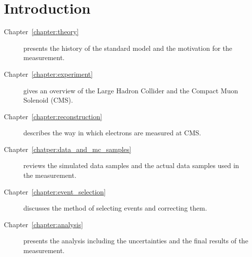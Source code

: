\chapter{Introduction}
\label{chapter:intro}

\begin{description}

    \item[Chapter~\ref{chapter:theory}] presents the history of the standard
        model and the motivation for the measurement.

    \item[Chapter~\ref{chapter:experiment}] gives an overview of the Large
        Hadron Collider and the Compact Muon Solenoid (CMS).

    \item[Chapter~\ref{chapter:reconstruction}] describes the way in which
        electrons are measured at CMS.

    \item[Chapter~\ref{chatper:data_and_mc_samples}] reviews the simulated data
        samples and the actual data samples used in the measurement.

    \item[Chapter~\ref{chapter:event_selection}] discusses the method of
        selecting events and correcting them.

    \item[Chapter~\ref{chapter:analysis}] presents the analysis including the
        uncertainties and the final results of the measurement.

\end{description}
